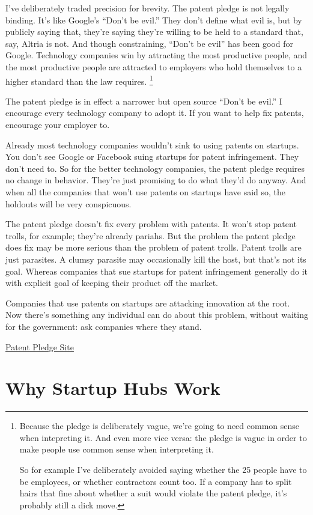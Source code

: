 \documentclass[12pt]{book}
\begin{document}
I've deliberately traded precision for brevity. The patent pledge is not
legally binding. It's like Google's ``Don't be evil.'' They don't define
what evil is, but by publicly saying that, they're saying they're
willing to be held to a standard that, say, Altria is not. And though
constraining, ``Don't be evil'' has been good for Google. Technology
companies win by attracting the most productive people, and the most
productive people are attracted to employers who hold themselves to a
higher standard than the law requires. \footnote{Because the pledge is deliberately vague, we're going to need
common sense when intepreting it. And even more vice versa: the pledge
is vague in order to make people use common sense when interpreting it.

So for example I've deliberately avoided saying whether the 25 people
have to be employees, or whether contractors count too. If a company has
to split hairs that fine about whether a suit would violate the patent
pledge, it's probably still a dick move.}

The patent pledge is in effect a narrower but open source ``Don't be
evil.'' I encourage every technology company to adopt it. If you want to
help fix patents, encourage your employer to.

Already most technology companies wouldn't sink to using patents on
startups. You don't see Google or Facebook suing startups for patent
infringement. They don't need to. So for the better technology
companies, the patent pledge requires no change in behavior. They're
just promising to do what they'd do anyway. And when all the companies
that won't use patents on startups have said so, the holdouts will be
very conspicuous.

The patent pledge doesn't fix every problem with patents. It won't stop
patent trolls, for example; they're already pariahs. But the problem the
patent pledge does fix may be more serious than the problem of patent
trolls. Patent trolls are just parasites. A clumsy parasite may
occasionally kill the host, but that's not its goal. Whereas companies
that sue startups for patent infringement generally do it with explicit
goal of keeping their product off the market.

Companies that use patents on startups are attacking innovation at the
root. Now there's something any individual can do about this problem,
without waiting for the government: ask companies where they stand.

\href{http://thepatentpledge.org}{Patent Pledge Site}
\chapter{Why Startup Hubs Work}
\end{document}
